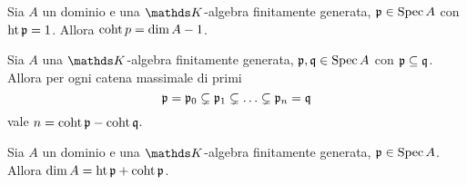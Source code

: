 \begin{lemma}
Sia $A$ un dominio e una $\KK$-algebra finitamente generata, $\pp\in\Spec A$ con $\height\pp=1$. Allora $\coht p=\dim A-1$.
\end{lemma}
\begin{proposition}
Sia $A$ una $\KK$-algebra finitamente generata, $\pp,\qq\in\Spec A$ con $\pp\subs\qq$. Allora per ogni catena massimale di primi
$$
\pp=\pp_0\subsn\pp_1\subsn\ldots\subsn\pp_n=\qq
$$
vale $n=\coht\pp-\coht\qq$.
\end{proposition}
\begin{corollary}
Sia $A$ un dominio e una $\KK$-algebra finitamente generata, $\pp\in\Spec A$. Allora $\dim A=\height\pp+\coht\pp$.
\end{corollary}




